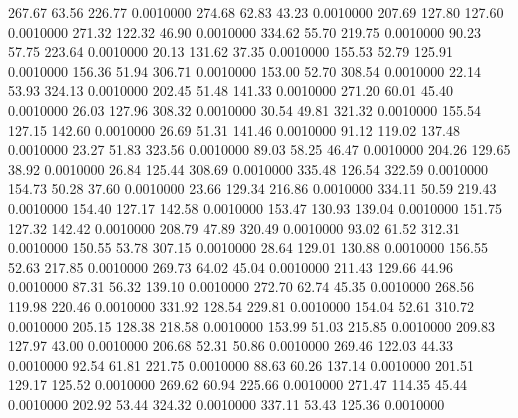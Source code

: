  267.67   63.56  226.77   0.0010000
 274.68   62.83   43.23   0.0010000
 207.69  127.80  127.60   0.0010000
 271.32  122.32   46.90   0.0010000
 334.62   55.70  219.75   0.0010000
  90.23   57.75  223.64   0.0010000
  20.13  131.62   37.35   0.0010000
 155.53   52.79  125.91   0.0010000
 156.36   51.94  306.71   0.0010000
 153.00   52.70  308.54   0.0010000
  22.14   53.93  324.13   0.0010000
 202.45   51.48  141.33   0.0010000
 271.20   60.01   45.40   0.0010000
  26.03  127.96  308.32   0.0010000
  30.54   49.81  321.32   0.0010000
 155.54  127.15  142.60   0.0010000
  26.69   51.31  141.46   0.0010000
  91.12  119.02  137.48   0.0010000
  23.27   51.83  323.56   0.0010000
  89.03   58.25   46.47   0.0010000
 204.26  129.65   38.92   0.0010000
  26.84  125.44  308.69   0.0010000
 335.48  126.54  322.59   0.0010000
 154.73   50.28   37.60   0.0010000
  23.66  129.34  216.86   0.0010000
 334.11   50.59  219.43   0.0010000
 154.40  127.17  142.58   0.0010000
 153.47  130.93  139.04   0.0010000
 151.75  127.32  142.42   0.0010000
 208.79   47.89  320.49   0.0010000
  93.02   61.52  312.31   0.0010000
 150.55   53.78  307.15   0.0010000
  28.64  129.01  130.88   0.0010000
 156.55   52.63  217.85   0.0010000
 269.73   64.02   45.04   0.0010000
 211.43  129.66   44.96   0.0010000
  87.31   56.32  139.10   0.0010000
 272.70   62.74   45.35   0.0010000
 268.56  119.98  220.46   0.0010000
 331.92  128.54  229.81   0.0010000
 154.04   52.61  310.72   0.0010000
 205.15  128.38  218.58   0.0010000
 153.99   51.03  215.85   0.0010000
 209.83  127.97   43.00   0.0010000
 206.68   52.31   50.86   0.0010000
 269.46  122.03   44.33   0.0010000
  92.54   61.81  221.75   0.0010000
  88.63   60.26  137.14   0.0010000
 201.51  129.17  125.52   0.0010000
 269.62   60.94  225.66   0.0010000
 271.47  114.35   45.44   0.0010000
 202.92   53.44  324.32   0.0010000
 337.11   53.43  125.36   0.0010000
